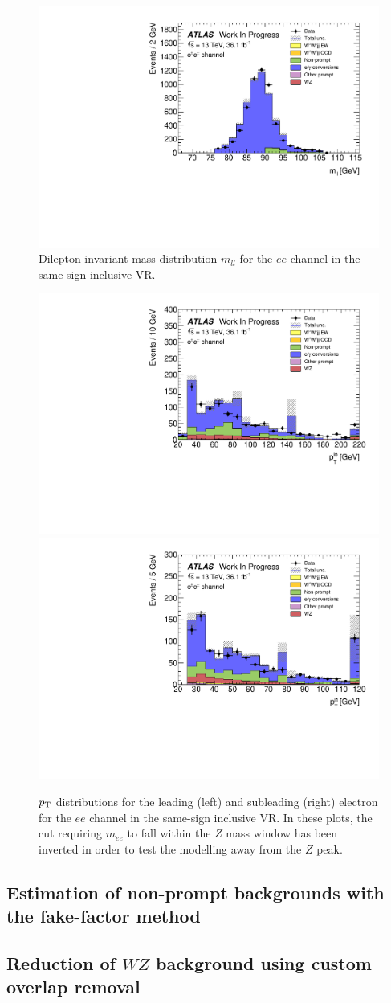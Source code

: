 \begin{figure}
  \centering
  \includegraphics[width=.48\textwidth]{figs/ssww_13tev/backgrounds/charge_flip/ee-CutCRInclusiveSSZ-Mll_Zpeak-lin}
  \caption{Dilepton invariant mass distribution $m_{ll}$ for the $ee$ channel in the same-sign inclusive VR.}
  \label{fig:ssww13tev_ssincl_mll}
\end{figure}

\begin{figure}
  \centering
  \includegraphics[width=.48\textwidth]{figs/ssww_13tev/backgrounds/charge_flip/ee-CutCRInclusiveSSZVeto-l0_pt-lin.pdf}
  \includegraphics[width=.48\textwidth]{figs/ssww_13tev/backgrounds/charge_flip/ee-CutCRInclusiveSSZVeto-l1_pt-lin.pdf}
  \caption{$p_{\mathrm{T}}$ distributions for the leading (left) and subleading (right) electron for the $ee$ channel in the same-sign inclusive VR.  In these plots, the cut requiring $m_{ee}$ to fall within the $Z$ mass window has been inverted in order to test the modelling away from the $Z$ peak.}
  \label{fig:ssww13tev_ssincl_ptlep}
\end{figure}

\subsection{Estimation of non-prompt backgrounds with the fake-factor method}\label{ssww13tev:fake_factor}


\subsection{Reduction of $WZ$ background using custom overlap removal}\label{ssww13tev:custom_or}

